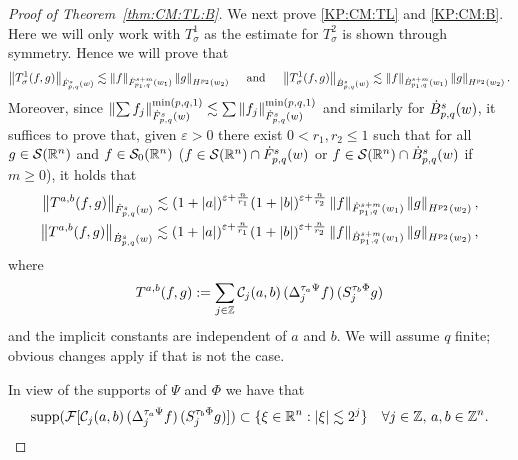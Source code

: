{\begin{proof}[Proof of Theorem~\ref{thm:CM:TL:B}]
We next prove \eqref{KP:CM:TL} and \eqref{KP:CM:B}. Here we will only work with $T_\sigma^1$ as the estimate for $T_\sigma^2$ is shown through symmetry. Hence we will prove that 
 \begin{align*}
 \norm{T^{1}_\sigma(f,g)}{\dot{F}^s_{p,q}(w)} \lesssim  \norm{f}{\dot{F}^{s+m}_{p_1, q}(w_1)} \norm{g}{H^{p_2}(w_2)}\quad  \text{ and }\quad 
 \norm{T^1_\sigma(f,g)}{\dot{B}^s_{p,q}(w)} \lesssim  \norm{f}{\dot{B}^{s+m}_{p_1, q}(w_1)} \norm{g}{H^{p_2}(w_2)}.
\end{align*}
  Moreover, since $\norm{\sum f_j}{\tlw{p}{s}{q}{w}}^{\min(p,q,1)}\lesssim \sum\norm{f_j}{\tlw{p}{s}{q}{w}}^{\min(p,q,1)}$  and similarly for $\besw{p}{s}{q}{w}$, it suffices to prove that, given $\varepsilon>0$ there exist $0<r_1,r_2\le 1$  such that for all $g\in \sw$ and  $f\in \swz$ ($f\in \sw\cap \tlw{p}{s}{q}{w}$ or  $f\in \sw\cap \besw{p}{s}{q}{w}$ if $m\ge 0$),  it holds that
\begin{align}
 \norm{T^{a,b}(f,g)}{\dot{F}^s_{p,q}(w)} \lesssim (1+\abs{a})^{\varepsilon+\frac{n}{r_1}}  (1+\abs{b})^{\varepsilon+\frac{n}{r_2}} \norm{f}{\dot{F}^{s+m}_{p_1, q}(w_1)} \norm{g}{H^{p_2}(w_2)}\label{eq:estbbTL},\\
 \norm{T^{a,b}(f,g)}{\dot{B}^s_{p,q}(w)} \lesssim (1+\abs{a})^{\varepsilon+\frac{n}{r_1}}  (1+\abs{b})^{\varepsilon+\frac{n}{r_2}} \norm{f}{\dot{B}^{s+m}_{p_1, q}(w_1)} \norm{g}{H^{p_2}(w_2)}\label{eq:estbbB},
\end{align}
where
\[
T^{a,b}(f,g):=\sum_{j\in\ent} \C_j(a,b) \,(\Do{ \tau_a \Psi }{j} f)\, (\So{ \tau_b \Phi }{j} g )
\]
and the implicit constants are independent of $a$ and $b.$  We will assume $q$ finite; obvious changes apply if that is not the case.

In view of the supports of $\Psi$ and $\Phi$ we have that 
\begin{equation*}
\supp (\mathcal{F}[\C_j(a,b) \,(\Do{ \tau_a \Psi }{j} f ) \, ( \So{ \tau_b \Phi }{j} g )])  \subset \{\xi \in \rn: |\xi| \lesssim 2^j \} \quad \forall j \in \ent,\,a,b\in \ent^n.
\end{equation*}


\end{proof}}
